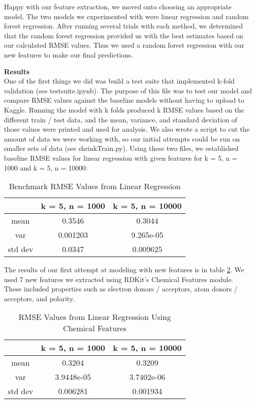 \documentclass[12pt]{article}
\begin{document}
Happy with our feature extraction, we moved onto choosing an appropriate model. The two models we experimented with were linear regression and random forest regression. After running several trials with each method, we determined that the random forest regression provided us with the best estimates based on our calculated RMSE values. Thus we used a random forest regression with our new features to make our final predictions. \\


\bigskip

\textbf{Results} \\
One of the first things we did was build a test suite that implemented k-fold validation (see testsuite.ipynb). The purpose of this file was to test our model and compare RMSE values against the baseline models without having to upload to Kaggle. Running the model with k folds produced k RMSE values based on the different train / test data, and the mean, variance, and standard deviation of those values were printed and used for analysis. We also wrote a script to cut the amount of data we were working with, so our initial attempts could be run on smaller sets of data (see shrinkTrain.py). Using these two files, we established baseline RMSE values for linear regression with given features for k = 5, n = 1000 and k = 5, n = 10000: \\

\begin{table}[h!]
\centering
\begin{tabular} {c | c | c}
& k = 5, n = 1000 & k = 5, n = 10000 \\ \hline
mean & 0.3546 & 0.3044 \\
var & 0.001203 & 9.265e-05 \\
std dev & 0.0347 & 0.009625 \\
\end{tabular}
\caption{Benchmark RMSE Values from Linear Regression}
\label{table:1}
\end{table}

\medskip

The results of our first attempt at modeling with new features is in table \ref{table:2}. We used 7 new features we extracted using RDKit's Chemical Features module. These included properties such as electron donors / acceptors, atom donors / acceptors, and polarity. \\

\begin{table}[h!]
\centering
\begin{tabular} {c | c | c}
& k = 5, n = 1000 & k = 5, n = 10000 \\ \hline
mean & 0.3204 & 0.3209 \\
var & 3.9448e-05 & 3.7402e-06 \\
std dev & 0.006281 & 0.001934 \\
\end{tabular}
\caption{RMSE Values from Linear Regression Using Chemical Features}
\label{table:2}
\end{table}
\end{document}

